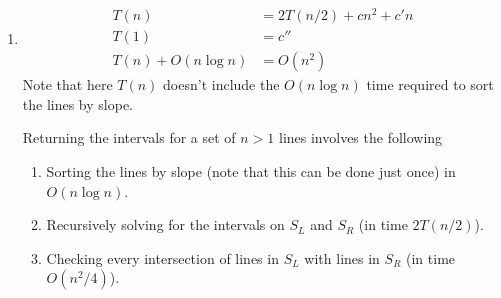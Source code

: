 \documentclass[12 pt, letterpaper]{hmcpset}
\begin{document}
\begin{solution}
\begin{enumerate}
			In the case that the set of lines is one line, return $I_{1} = \mathbb{R}$ and $L_{1}$ is the one line.

			Suppose the set of lines $S$ has size $n > 1$. Sort the lines by slope (from least to greatest). Divide the lines into two subsets --- those with slope greater than the median slope (call this $S_{R}$ for lines on the right) and those with slope at most the median slope (call this $S_{L}$ for lines on the left). Recursively find the intervals on which lines are visible.

			Note that all the lines that are visible in the whole configuration $S$, must be visible in $S_{L}$ and $S_{R}$. Thus, we only need to determine which of the lines are made invisible in combining $S_{L}$ and $S_{R}$. A visible line in $S_{L}$ is made invisible if it intersects a line of $S_{R}$ to the left of the interval where it's visible. Since the slope of the $S_{R}$ line is greater, its $y$-coordinate is greater to the right of the intersection point, and thus, over the whole interval where the $S_{L}$ line is visible. Similarly, a visible line in  $S_{R}$ is made invisible if it intersects a line of $S_{L}$ to the right of the interval where it's visible. Checking every pair of intersections, we can remove all invisible lines, and then update the intersections.


		\item \[
			\boxed{
				\begin{aligned}
					T(n) & = 2 T(n / 2) + cn^{2} + c' n \\
					T(1) & = c'' \\
					T(n) + O(n \log n) & = O(n^{2})
				\end{aligned}
			}
		\]
		Note that here $T(n)$ doesn't include the $O(n \log n)$ time required to sort the lines by slope.

		Returning the intervals for a set of $n > 1$ lines involves the following
		\begin{enumerate}[label = \arabic*.]
			\item Sorting the lines by slope (note that this can be done just once) in $O(n \log n)$.
			\item Recursively solving for the intervals on $S_{L}$ and $S_{R}$ (in time $2 T(n / 2)$).
			\item Checking every intersection of lines in  $S_{L}$ with lines in $S_{R}$ (in time $O(n^{2} / 4)$).


\end{enumerate}
\end{enumerate}
\end{solution}
\end{document}
